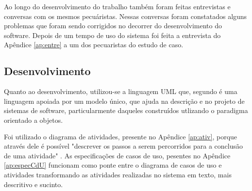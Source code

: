Ao longo do desenvolvimento do trabalho também foram feitas entrevistas e conversas com os mesmos pecuáristas. Nessas conversas foram constatados alguns problemas que foram sendo corrigidos no decorrer do desenvolvimento do software. Depois de um tempo de uso do sistema foi feita a entrevista do Apêndice \ref{ap:entre} a um dos pecuaristas do estudo de caso.

\subsection{\textbf{Desenvolvimento}}

Quanto ao desenvolvimento, utilizou-se a linguagem UML que, segundo  é uma linguagem apoiada por um modelo único, que ajuda na descrição e no projeto de sistemas de software, particularmente daqueles construídos utlizando o paradigma orientado a objetos.

Foi utilizado o diagrama de atividades, presente no Apêndice \ref{ap:ativ}, porque através dele é possível "descrever os passos a serem percorridos para a conclusão de uma atividade"  \cite{guedes18}. As especificações de casos de uso, pesentes no Apêndice \ref{ap:especCdU} funcionam como ponte entre o diagrama de casos de uso e atividades transformando as atividades realizadas no sistema em texto, mais descritivo e sucinto.
